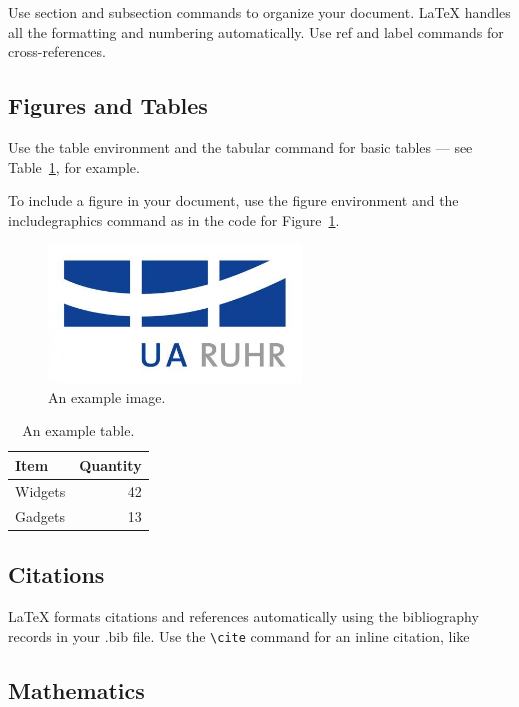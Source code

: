 \documentclass[fleqn,10pt,twoside]{gcb15submission}
\begin{document}
Use section and subsection commands to organize your document. \LaTeX{} handles all the formatting and numbering automatically. Use ref and label commands for cross-references.

\subsection*{Figures and Tables}

Use the table environment and the tabular command for basic tables --- see Table~\ref{tab:widgets}, for example.

To include a figure in your document, use the figure environment and the includegraphics command as in the code for Figure~\ref{fig:uaruhr}.

\begin{figure}[ht]\centering
\includegraphics[width=0.6\textwidth]{uaruhr}
\caption{An example image.}
\label{fig:uaruhr}
\end{figure}

\begin{table}[ht]
\centering
\begin{tabular}{l|r}
Item & Quantity \\\hline
Widgets & 42 \\
Gadgets & 13
\end{tabular}
\caption{\label{tab:widgets}An example table.}
\end{table}

\subsection*{Citations}

LaTeX formats citations and references automatically using the bibliography records in your .bib file.
Use the \verb|\cite| command for an inline citation, like 

\subsection*{Mathematics}
\end{document}
